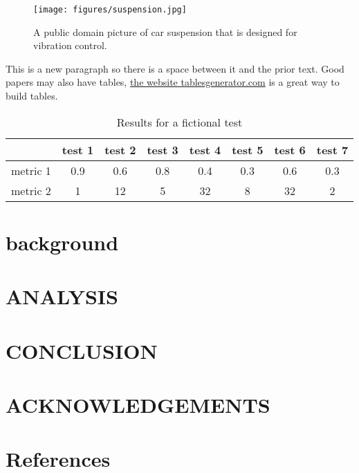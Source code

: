 \documentclass[10pt,letterpaper]{article}
\begin{document}
\begin{figure}
	\centering
	\texttt{[image: figures/suspension.jpg]}
	\caption{A public domain picture of car suspension that is designed for vibration control.}
	\label{fig:suspension}
\end{figure}

This is a new paragraph so there is a space between it and the prior text. Good papers may also have tables, \href{https://www.tablesgenerator.com/}{the website tablesgenerator.com} is a great way to build tables.  
\begin{table}[]
	\centering
	\caption{Results for a fictional test}
	\label{table:test}
	\begin{tabular}{@{}lccccccc@{}}
		\toprule
		 & test 1 & test 2 & test 3 & test 4 & test 5 & test 6 & test 7 \\ \midrule
		metric 1 & 0.9 & 0.6 & 0.8 & 0.4 & 0.3 & 0.6 & 0.3 \\
		metric 2 & 1 & 12 & 5 & 32 & 8 & 32 & 2 \\ \bottomrule
	\end{tabular}
\end{table}


\blindtext


\section{background}
\blindtext

\section{ANALYSIS}
\blindtext

\section{CONCLUSION}
\blindtext

\section{ACKNOWLEDGEMENTS}
\blindtext

\section{References}
\vspace{-1.5ex}

\renewcommand{\refname}{}

\end{document}
